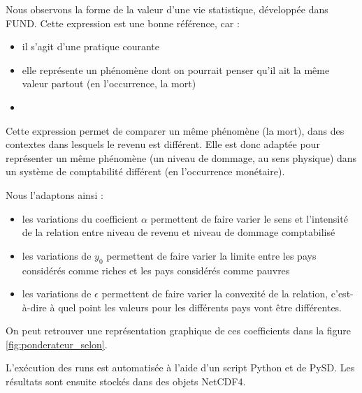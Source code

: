 \begin{methodbox}
Nous observons la forme de la valeur d'une vie statistique, développée dans FUND. Cette expression est une bonne référence, car : 

\begin{itemize}
    \item il s'agit d'une pratique courante
    \item elle représente un phénomène dont on pourrait penser qu'il ait la même valeur partout (en l'occurrence, la mort)
    \item 
\end{itemize}

Cette expression permet de comparer un même phénomène (la mort), dans des contextes dans lesquels le revenu est différent. Elle est donc adaptée pour représenter un même phénomène (un niveau de dommage, au sens physique) dans un système de comptabilité différent (en l'occurrence monétaire). 

Nous l'adaptons ainsi : 

\begin{itemize}
    \item les variations du coefficient $\alpha$ permettent de faire varier le sens et l'intensité de la relation entre niveau de revenu et niveau de dommage comptabilisé
    \item les variations de $y_0$ permettent de faire varier la limite entre les pays considérés comme riches et les pays considérés comme pauvres
    \item les variations de $\epsilon$ permettent de faire varier la convexité de la relation, c'est-à-dire à quel point les valeurs pour les différents pays vont être différentes. 
\end{itemize}

On peut retrouver une représentation graphique de ces coefficients dans la figure \ref{fig:ponderateur_selon}.
\vspace{2cm}

\centering

\end{methodbox}
\begin{methodbox}
L'exécution des runs est automatisée à l'aide d'un script Python et de PySD.  Les résultats sont ensuite stockés dans des objets NetCDF4. 

    
\end{methodbox}

